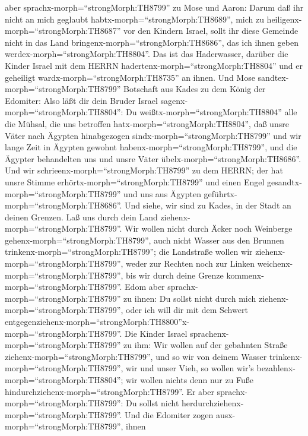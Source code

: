 aber sprachx-morph=``strongMorph:TH8799'' zu Mose und Aaron: Darum daß
ihr nicht an mich geglaubt habtx-morph=``strongMorph:TH8689'', mich zu
heiligenx-morph=``strongMorph:TH8687'' vor den Kindern Israel, sollt ihr
diese Gemeinde nicht in das Land bringenx-morph=``strongMorph:TH8686'',
das ich ihnen geben werdex-morph=``strongMorph:TH8804''. 
Das ist das Haderwasser, darüber die Kinder Israel mit dem HERRN
hadertenx-morph=``strongMorph:TH8804'' und er geheiligt
wardx-morph=``strongMorph:TH8735'' an ihnen.  Und Mose
sandtex-morph=``strongMorph:TH8799'' Botschaft aus Kades zu dem König
der Edomiter: Also läßt dir dein Bruder Israel
sagenx-morph=``strongMorph:TH8804'': Du
weißtx-morph=``strongMorph:TH8804'' alle die Mühsal, die uns betroffen
hatx-morph=``strongMorph:TH8804'',  daß unsre Väter nach
Ägypten hinabgezogen sindx-morph=``strongMorph:TH8799'' und wir lange
Zeit in Ägypten gewohnt habenx-morph=``strongMorph:TH8799'', und die
Ägypter behandelten uns und unsre Väter
übelx-morph=``strongMorph:TH8686''.  Und wir
schrieenx-morph=``strongMorph:TH8799'' zu dem HERRN; der hat unsre
Stimme erhörtx-morph=``strongMorph:TH8799'' und einen Engel
gesandtx-morph=``strongMorph:TH8799'' und uns aus Ägypten
geführtx-morph=``strongMorph:TH8686''. Und siehe, wir sind zu Kades, in
der Stadt an deinen Grenzen.  Laß uns durch dein Land
ziehenx-morph=``strongMorph:TH8799''. Wir wollen nicht durch Äcker noch
Weinberge gehenx-morph=``strongMorph:TH8799'', auch nicht Wasser aus den
Brunnen trinkenx-morph=``strongMorph:TH8799''; die Landstraße wollen wir
ziehenx-morph=``strongMorph:TH8799'', weder zur Rechten noch zur Linken
weichenx-morph=``strongMorph:TH8799'', bis wir durch deine Grenze
kommenx-morph=``strongMorph:TH8799''.  Edom aber
sprachx-morph=``strongMorph:TH8799'' zu ihnen: Du sollst nicht durch
mich ziehenx-morph=``strongMorph:TH8799'', oder ich will dir mit dem
Schwert
entgegenziehenx-morph=``strongMorph:TH8800''x-morph=``strongMorph:TH8799''.
 Die Kinder Israel sprachenx-morph=``strongMorph:TH8799''
zu ihm: Wir wollen auf der gebahnten Straße
ziehenx-morph=``strongMorph:TH8799'', und so wir von deinem Wasser
trinkenx-morph=``strongMorph:TH8799'', wir und unser Vieh, so wollen
wir's bezahlenx-morph=``strongMorph:TH8804''; wir wollen nichts denn nur
zu Fuße hindurchziehenx-morph=``strongMorph:TH8799''.  Er
aber sprachx-morph=``strongMorph:TH8799'': Du sollst nicht
herdurchziehenx-morph=``strongMorph:TH8799''. Und die Edomiter zogen
ausx-morph=``strongMorph:TH8799'', ihnen
